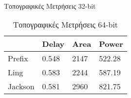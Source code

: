 \begin{multicols}{2}
\begin{table}[H]
\caption{Τοπογραφικές Μετρήσεις 32-bit}
\label{topo_result_table_32}
\end{table}
\begin{table}[H]
\centering
     \begin{tabular}{||p{1.2cm} | p{0.7cm} p{1cm} p{1cm} ||} 
        \hline
         & Delay & Area & Power \\ [0.5ex] 
        \hline\hline
        Prefix & 0.548 & 2147 & 522.28 \\
        \hline
        Ling & 0.583 & 2244 & 587.19 \\
        \hline
        Jackson & 0.581 & 2960 & 821.75 \\
        \hline
    \end{tabular}
\caption{Τοπογραφικές Μετρήσεις 64-bit}
\label{topo_result_table_64}
\end{table}
\end{multicols}








